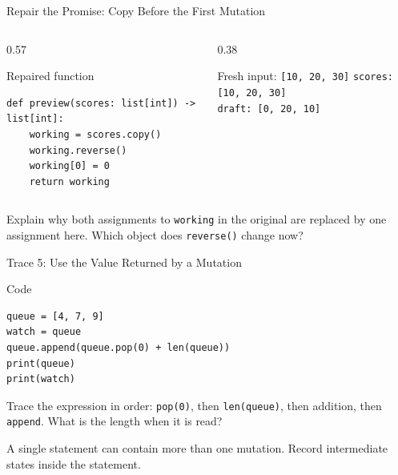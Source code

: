 \documentclass[aspectratio=169,10pt]{beamer}
\begin{document}
\begin{frame}[fragile]{Repair the Promise: Copy Before the First Mutation}
  \begin{columns}[T,onlytextwidth]
    \begin{column}{0.57\textwidth}
      \begin{block}{Repaired function}
\begin{verbatim}
def preview(scores: list[int]) -> list[int]:
    working = scores.copy()
    working.reverse()
    working[0] = 0
    return working
\end{verbatim}
      \end{block}
    \end{column}
    \begin{column}{0.38\textwidth}
      \begin{block}{Fresh input: \texttt{[10, 20, 30]}}
        \texttt{scores: [10, 20, 30]}\\[0.08in]
        \texttt{draft: [0, 20, 10]}
      \end{block}
    \end{column}
  \end{columns}
  \begin{activity}
    Explain why both assignments to \texttt{working} in the original are replaced by one assignment here. Which object does \texttt{reverse()} change now?
  \end{activity}
\end{frame}

\begin{frame}[fragile]{Trace 5: Use the Value Returned by a Mutation}
  \begin{block}{Code}
\begin{verbatim}
queue = [4, 7, 9]
watch = queue
queue.append(queue.pop(0) + len(queue))
print(queue)
print(watch)
\end{verbatim}
  \end{block}
  \begin{activity}
    Trace the expression in order: \texttt{pop(0)}, then \texttt{len(queue)}, then addition, then \texttt{append}. What is the length when it is read?
  \end{activity}
  A single statement can contain more than one mutation. Record intermediate states inside the statement.
\end{frame}
\end{document}

